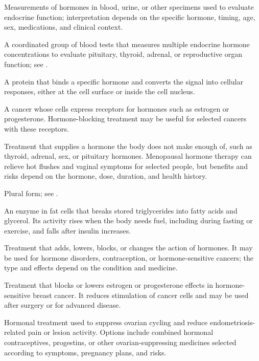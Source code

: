 Measurements of hormones in blood, urine, or other specimens used to evaluate endocrine function; interpretation depends on the specific hormone, timing, age, sex, medications, and clinical context.

 A coordinated group of blood tests that measures multiple endocrine hormone concentrations to evaluate pituitary, thyroid, adrenal, or reproductive organ function; see .

 A protein that binds a specific hormone and converts the signal into cellular responses, either at the cell surface or inside the cell nucleus.

 A cancer whose cells express receptors for hormones such as estrogen or progesterone. Hormone-blocking treatment may be useful for selected cancers with these receptors.

 Treatment that supplies a hormone the body does not make enough of, such as thyroid, adrenal, sex, or pituitary hormones. Menopausal hormone therapy can relieve hot flushes and vaginal symptoms for selected people, but benefits and risks depend on the hormone, dose, duration, and health history.

 Plural form; see .

 An enzyme in fat cells that breaks stored triglycerides into fatty acids and glycerol. Its activity rises when the body needs fuel, including during fasting or exercise, and falls after insulin increases.

 Treatment that adds, lowers, blocks, or changes the action of hormones. It may be used for hormone disorders, contraception, or hormone-sensitive cancers; the type and effects depend on the condition and medicine.

 Treatment that blocks or lowers estrogen or progesterone effects in hormone-sensitive breast cancer. It reduces stimulation of cancer cells and may be used after surgery or for advanced disease.

 Hormonal treatment used to suppress ovarian cycling and reduce endometriosis-related pain or lesion activity. Options include combined hormonal contraceptives, progestins, or other ovarian-suppressing medicines selected according to symptoms, pregnancy plans, and risks.

